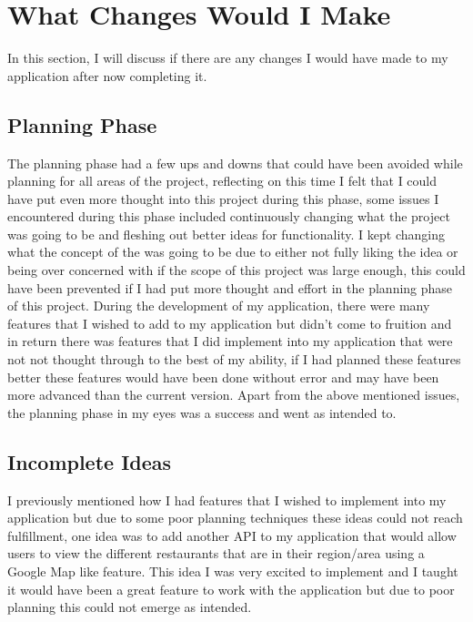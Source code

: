 \section{What Changes Would I Make}

In this section, I will discuss if there are any changes I would have made to my application after now completing it.

\subsection{Planning Phase}

The planning phase had a few ups and downs that could have been avoided while planning for all areas of the project, reflecting on this time I felt that I could have put even more thought into this project during this phase, some issues I encountered during this phase included continuously changing what the project was going to be and fleshing out better ideas for functionality. I kept changing what the concept of the was going to be due to either not fully liking the idea or being over concerned with if the scope of this project was large enough, this could have been prevented if I had put more thought and effort in the planning phase of this project. During the development of my application, there were many features that I wished to add to my application but didn't come to fruition and in return there was features that I did implement into my application that were not not thought through to the best of my ability, if I had planned these features better these features would have been done without error and may have been more advanced than the current version. Apart from the above mentioned issues, the planning phase in my eyes was a success and went as intended to.

\subsection{Incomplete Ideas}

I previously mentioned how I had features that I wished to implement into my application but due to some poor planning techniques these ideas could not reach fulfillment, one idea was to add another API to my application that would allow users to view the different restaurants that are in their region/area using a Google Map like feature. This idea I was very excited to implement and I taught it would have been a great feature to work with the application but due to poor planning this could not emerge as intended.


